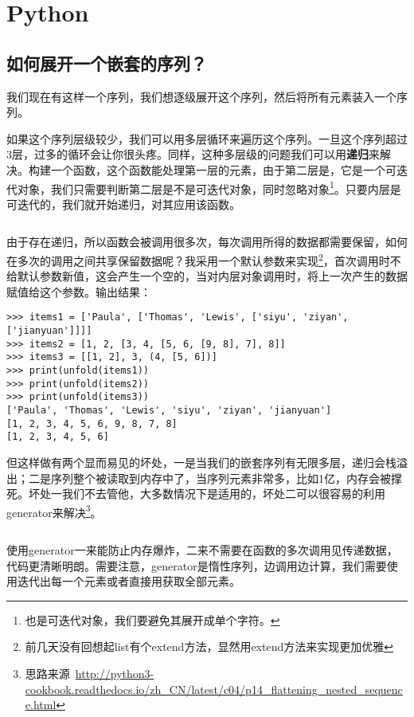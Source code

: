 \chapter{Python}

\section{如何展开一个嵌套的序列？}

我们现在有这样一个序列，我们想逐级展开这个序列，然后将所有元素装入一个序列。

如果这个序列层级较少，我们可以用多层循环来遍历这个序列。一旦这个序列超过3层，过多的循环会让你很头疼。同样，这种多层级的问题我们可以用\textbf{递归}来解决。构建一个函数，这个函数能处理第一层的元素，由于第二层是，它是一个可迭代对象，我们只需要判断第二层是不是可迭代对象，同时忽略对象\footnote{也是可迭代对象，我们要避免其展开成单个字符。}。只要内层是可迭代的，我们就开始递归，对其应用该函数。

\inputminted{python}{code/python/unfold.py}

由于存在递归，所以函数会被调用很多次，每次调用所得的数据都需要保留，如何在多次的调用之间共享保留数据呢？我采用一个默认参数来实现\footnote{前几天没有回想起list有个extend方法，显然用extend方法来实现更加优雅}，首次调用时不给默认参数新值，这会产生一个空的，当对内层对象调用时，将上一次产生的数据赋值给这个参数。输出结果：

\begin{verbatim}
>>> items1 = ['Paula', ['Thomas', 'Lewis', ['siyu', 'ziyan', ['jianyuan']]]]
>>> items2 = [1, 2, [3, 4, [5, 6, [9, 8], 7], 8]]
>>> items3 = [[1, 2], 3, (4, [5, 6])]
>>> print(unfold(items1))
>>> print(unfold(items2))
>>> print(unfold(items3))
['Paula', 'Thomas', 'Lewis', 'siyu', 'ziyan', 'jianyuan']
[1, 2, 3, 4, 5, 6, 9, 8, 7, 8]
[1, 2, 3, 4, 5, 6]
\end{verbatim}

但这样做有两个显而易见的坏处，一是当我们的嵌套序列有无限多层，递归会栈溢出；二是序列整个被读取到内存中了，当序列元素非常多，比如1亿，内存会被撑死。坏处一我们不去管他，大多数情况下是适用的，坏处二可以很容易的利用generator来解决\footnote{思路来源~\url{http://python3-cookbook.readthedocs.io/zh_CN/latest/c04/p14_flattening_nested_sequence.html}}。

\inputminted{python}{code/python/unfold_generator.py}

使用generator一来能防止内存爆炸，二来不需要在函数的多次调用见传递数据，代码更清晰明朗。需要注意，generator是惰性序列，边调用边计算，我们需要使用迭代出每一个元素或者直接用获取全部元素。

